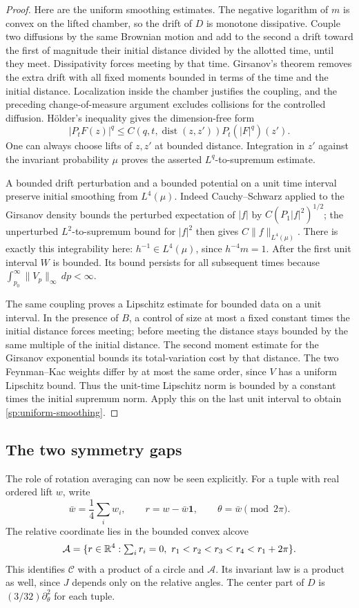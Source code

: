 \begin{proof}
Here are the uniform smoothing estimates.  The negative logarithm of
$m$ is convex on the lifted chamber, so the drift of $D$ is monotone
dissipative.  Couple two diffusions by the same Brownian motion and
add to the second a drift toward the first of magnitude their initial
distance divided by the allotted time, until they meet.  Dissipativity
forces meeting by that time.  Girsanov's theorem removes the extra
drift with all fixed moments bounded in terms of the time and the
initial distance.  Localization inside the chamber justifies the
coupling, and the preceding change-of-measure argument excludes
collisions for the controlled diffusion.  H\"older's inequality gives
the dimension-free form
\[
 |P_tF(z)|^q\le
 C(q,t,\operatorname{dist}(z,z'))P_t(|F|^q)(z').
\]
One can always choose lifts of $z,z'$ at bounded distance.
Integration in $z'$ against the invariant probability $\mu$ proves
the asserted $L^q$-to-supremum estimate.

A bounded drift perturbation and a bounded potential on a unit time
interval preserve initial smoothing from $L^4(\mu)$.
Indeed Cauchy--Schwarz applied to the Girsanov density bounds the
perturbed expectation of $|f|$ by $C(P_1|f|^2)^{1/2}$;
the unperturbed $L^2$-to-supremum bound for $|f|^2$ then gives
$C\|f\|_{L^4(\mu)}$.  There is exactly this integrability here:
$h^{-1}\in L^4(\mu)$, since $h^{-4}m=1$.
After the first unit interval $W$ is bounded.  Its bound persists
for all subsequent times because
$\int_{p_0}^\infty\|V_p\|_\infty\,dp<\infty$.

The same coupling proves a Lipschitz estimate for bounded data on a
unit interval.  In the presence of $B$, a control of size at most a
fixed constant times the initial distance forces meeting; before
meeting the distance stays bounded by the same multiple of the
initial distance.  The second moment estimate for the Girsanov
exponential bounds its total-variation cost by that distance.
The two Feynman--Kac weights differ by at most the same order, since
$V$ has a uniform Lipschitz bound.  Thus the unit-time Lipschitz norm
is bounded by a constant times the initial supremum norm.  Apply this
on the last unit interval to obtain
\eqref{sp:uniform-smoothing}.
\end{proof}

\subsection{The two symmetry gaps}

The role of rotation averaging can now be seen explicitly.  For a
tuple with real ordered lift $w$, write
\[
 \bar w=\frac14\sum_iw_i,\qquad
 r=w-\bar w\mathbf1,\qquad \theta=\bar w\pmod{2\pi}.
\]
The relative coordinate lies in the bounded convex alcove
\[
 \mathcal A=\{r\in\R^4:\textstyle\sum_ir_i=0,
                         \ r_1<r_2<r_3<r_4<r_1+2\pi\}.
\]
This identifies $\mathcal C$ with a product of a circle and
$\mathcal A$.  Its invariant law is a product as well, since $J$
depends only on the relative angles.  The center part of $D$ is
$(3/32)\partial_\theta^2$ for each tuple.

